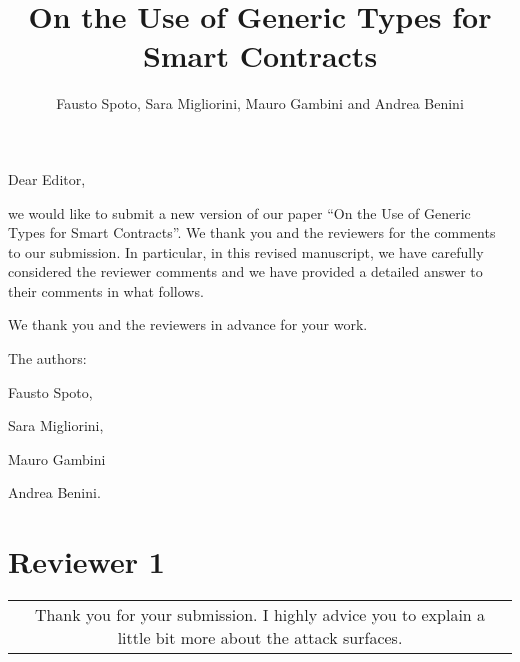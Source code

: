 \documentclass[journal,onecolumn, 11pt]{IEEEtran}
\newcommand{\BOX}[1]
{
  {\it
    \begin{center}
      \begin{tabular}{|c|}
        \hline
        \parbox{0.97\columnwidth}{
          \medskip
          #1
          \medskip} \\
        \hline
      \end{tabular}
    \end{center}
  }
}
\begin{document}
\title{{\LARGE On the Use of Generic Types for Smart Contracts}}

\author{{\normalsize Fausto Spoto, Sara Migliorini, Mauro Gambini and Andrea Benini
\\}}

\date{}

\maketitle



Dear Editor,

\vspace{2mm}

we would like to submit a new version of our paper ``On the Use of Generic Types for Smart Contracts''. We thank you and the reviewers for the comments to our submission. In particular, in this revised manuscript, we have carefully considered the reviewer comments and we have provided a detailed answer to their comments in what follows.

\vspace{5mm}

We thank you and the reviewers in advance for your work.
\vspace{5mm}

        \hspace{7cm} The authors:
\vspace{5mm}

                \hspace{7cm} Fausto Spoto, 

                \hspace{7cm} Sara Migliorini, 

                \hspace{7cm} Mauro Gambini 
                
                \hspace{7cm} Andrea Benini.

\newpage


\section*{\textbf{Reviewer 1}}

\BOX{
Thank you for your submission. I highly advice you to explain a little bit more about the attack surfaces.
}
\end{document}
